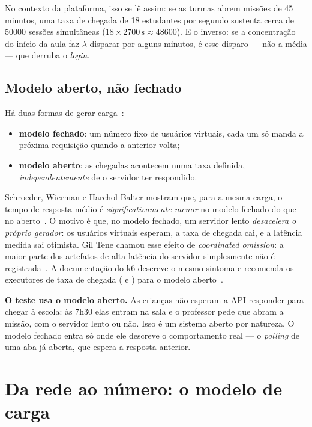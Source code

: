 \documentclass[11pt, a4paper, oneside, openany]{report}
\begin{document}
No contexto da plataforma, isso se lê assim: se as turmas abrem missões de 45
minutos, uma taxa de chegada de 18 estudantes por segundo sustenta cerca de
\num{50000} sessões simultâneas ($18 \times 2700\,\text{s} \approx \num{48600}$).
E o inverso: se a concentração do início da aula faz $\lambda$ disparar por
alguns minutos, é esse disparo --- não a média --- que derruba o \emph{login}.

\section{Modelo aberto, não fechado}

Há duas formas de gerar carga~\cite{schroeder2006}:
\begin{itemize}
  \item \textbf{modelo fechado}: um número fixo de usuários virtuais, cada um
    só manda a próxima requisição quando a anterior volta;
  \item \textbf{modelo aberto}: as chegadas acontecem numa taxa definida,
    \emph{independentemente} de o servidor ter respondido.
\end{itemize}

Schroeder, Wierman e Harchol-Balter mostram que, para a mesma carga, o tempo de
resposta médio é \emph{significativamente menor} no modelo fechado do que no
aberto~\cite{schroeder2006}. O motivo é que, no modelo fechado, um servidor
lento \emph{desacelera o próprio gerador}: os usuários virtuais esperam, a taxa
de chegada cai, e a latência medida sai otimista. Gil Tene chamou esse efeito de
\emph{coordinated omission}: a maior parte dos artefatos de alta latência do
servidor simplesmente não é registrada~\cite{tene2013,tenewrk2}. A documentação
do k6 descreve o mesmo sintoma e recomenda os executores de taxa de chegada
( e ) para o modelo
aberto~\cite{k6openclosed}.

\begin{decisao}
\textbf{O teste usa o modelo aberto.} As crianças não esperam a API responder
para chegar à escola: às 7h30 elas entram na sala e o professor pede que abram
a missão, com o servidor lento ou não. Isso é um sistema aberto por natureza. O
modelo fechado entra só onde ele descreve o comportamento real --- o
\emph{polling} de uma aba já aberta, que espera a resposta anterior.
\end{decisao}

\chapter{Da rede ao número: o modelo de carga}
\label{cap:modelo}
\end{document}
